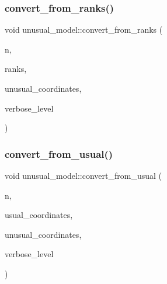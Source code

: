 \mbox{\label{classunusual__model_affe6f50031dfc606a0dca7ff5e26cc14}} 
\subsubsection{\texorpdfstring{convert\+\_\+from\+\_\+ranks()}{convert\_from\_ranks()}}
{\footnotesize\ttfamily void unusual\+\_\+model\+::convert\+\_\+from\+\_\+ranks (\begin{DoxyParamCaption}\item[{\mbox{\hyperlink{galois_8h_a09fddde158a3a20bd2dcadb609de11dc}{I\+NT}}}]{n,  }\item[{\mbox{\hyperlink{galois_8h_a09fddde158a3a20bd2dcadb609de11dc}{I\+NT}} $\ast$}]{ranks,  }\item[{\mbox{\hyperlink{galois_8h_a09fddde158a3a20bd2dcadb609de11dc}{I\+NT}} $\ast$}]{unusual\+\_\+coordinates,  }\item[{\mbox{\hyperlink{galois_8h_a09fddde158a3a20bd2dcadb609de11dc}{I\+NT}}}]{verbose\+\_\+level }\end{DoxyParamCaption})}

\mbox{\label{classunusual__model_a9aee4f3bcd77c4d6bab45f4a25fd4ae2}} 
\subsubsection{\texorpdfstring{convert\+\_\+from\+\_\+usual()}{convert\_from\_usual()}}
{\footnotesize\ttfamily void unusual\+\_\+model\+::convert\+\_\+from\+\_\+usual (\begin{DoxyParamCaption}\item[{\mbox{\hyperlink{galois_8h_a09fddde158a3a20bd2dcadb609de11dc}{I\+NT}}}]{n,  }\item[{\mbox{\hyperlink{galois_8h_a09fddde158a3a20bd2dcadb609de11dc}{I\+NT}} $\ast$}]{usual\+\_\+coordinates,  }\item[{\mbox{\hyperlink{galois_8h_a09fddde158a3a20bd2dcadb609de11dc}{I\+NT}} $\ast$}]{unusual\+\_\+coordinates,  }\item[{\mbox{\hyperlink{galois_8h_a09fddde158a3a20bd2dcadb609de11dc}{I\+NT}}}]{verbose\+\_\+level }\end{DoxyParamCaption})}

